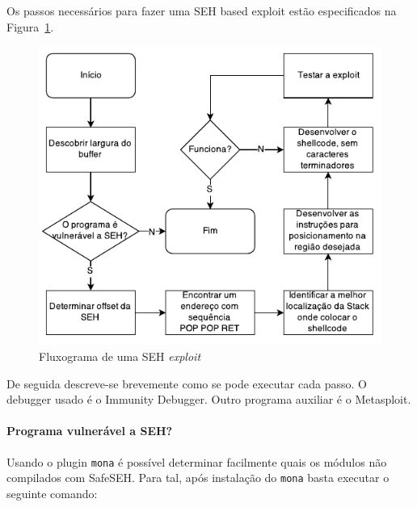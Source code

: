 \documentclass[a4paper]{article}
\begin{document}
Os passos necessários para fazer uma SEH based exploit estão especificados na Figura~\ref{fig:flowchart1}.


\begin{figure}[h]
        \centering
        \includegraphics[width=0.7\linewidth]{fc1}
        \caption{Fluxograma de uma SEH \textit{exploit}}
        \label{fig:flowchart1}
\end{figure}
De seguida descreve-se brevemente como se pode executar cada passo. O debugger usado é o Immunity Debugger. Outro programa auxiliar é o Metasploit.

\paragraph*{Programa vulnerável a SEH?} Usando o plugin \texttt{mona} é possível determinar facilmente quais os módulos não compilados com SafeSEH. Para tal, após instalação do \texttt{mona} basta executar o seguinte comando:
\end{document}
